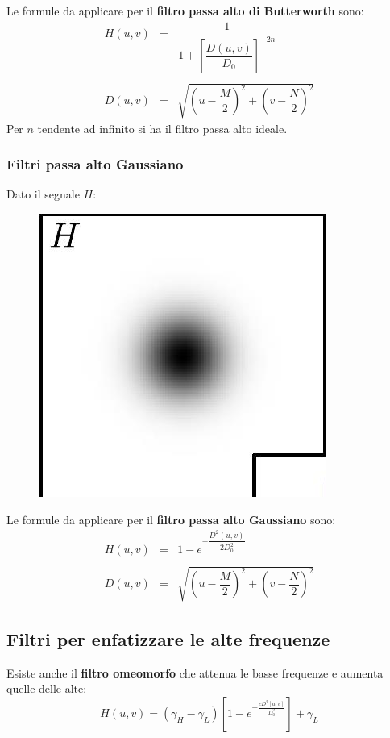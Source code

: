 \documentclass[a4paper]{article}
\begin{document}
	\noindent
	Le formule da applicare per il \textcolor{Red3}{\textbf{filtro passa alto di Butterworth}} sono:
	\begin{equation*}
		\begin{array}{lll}
			H\left(u,v\right) & = & \dfrac{1}{1 + \left[\dfrac{D\left(u,v\right)}{D_{0}}\right]^{-2n}} \\
			&& \\
			D\left(u,v\right) & = & \sqrt{\left(u - \dfrac{M}{2}\right)^{2} + \left(v - \dfrac{N}{2}\right)^{2}}
		\end{array}
	\end{equation*}
	Per $n$ tendente ad infinito si ha il filtro passa alto ideale.\newpage
	
	\subsubsection{Filtri passa alto Gaussiano}
	
	Dato il segnale $H$:
	\begin{figure}[!htp]
		\centering
		\includegraphics[width=.3\textwidth]{img/filtro_passa_alto_gaussiano.png}
	\end{figure}
	
	\noindent
	Le formule da applicare per il \textcolor{Red3}{\textbf{filtro passa alto Gaussiano}} sono:
	\begin{equation*}
		\begin{array}{lll}
			H\left(u,v\right) & = & 1 - e^{- \dfrac{D^{2}\left(u,v\right)}{2 D^{2}_{0}}} \\
			&& \\
			D\left(u,v\right) & = & \sqrt{\left(u - \dfrac{M}{2}\right)^{2} + \left(v - \dfrac{N}{2}\right)^{2}}
		\end{array}
	\end{equation*}\newpage

	\subsection{Filtri per enfatizzare le alte frequenze}
	
	Esiste anche il \textcolor{Red3}{\textbf{filtro omeomorfo}} che attenua le basse frequenze e aumenta quelle delle alte:
	\begin{equation*}
		H\left(u,v\right) = \left(\gamma_{H} - \gamma_{L}\right)\left[1 - e^{- \frac{c D^{2}\left[u,v\right]}{D_{0}^{2}}}\right] + \gamma_{L}
	\end{equation*}
\end{document}

